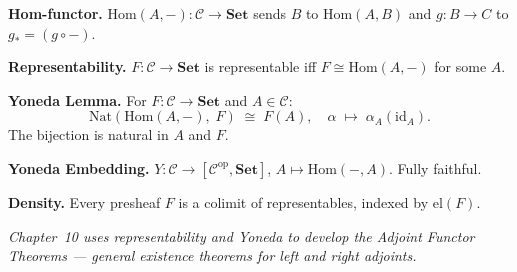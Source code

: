 \begin{formalrestatement}
\textbf{Hom-functor.}\quad
$\mathrm{Hom}(A, -) : \mathcal{C} \to \mathbf{Set}$ sends $B$ to
$\mathrm{Hom}(A, B)$ and $g : B \to C$ to $g_* = (g \circ -)$.

\medskip
\textbf{Representability.}\quad
$F : \mathcal{C} \to \mathbf{Set}$ is representable iff
$F \cong \mathrm{Hom}(A, -)$ for some $A$.

\medskip
\textbf{Yoneda Lemma.}\quad
For $F : \mathcal{C} \to \mathbf{Set}$ and $A \in \mathcal{C}$:
\begin{equation*}
  \mathrm{Nat}(\mathrm{Hom}(A, -),\; F) \;\cong\; F(A),
  \quad \alpha \;\mapsto\; \alpha_A(\mathrm{id}_A).
\end{equation*}
The bijection is natural in $A$ and $F$.

\medskip
\textbf{Yoneda Embedding.}\quad
$\mathit{Y} : \mathcal{C} \to [\mathcal{C}^{\mathrm{op}}, \mathbf{Set}]$,
$A \mapsto \mathrm{Hom}(-, A)$. Fully faithful.

\medskip
\textbf{Density.}\quad
Every presheaf $F$ is a colimit of representables, indexed by
$\mathrm{el}(F)$.

\medskip
\noindent\textit{Chapter~10 uses representability and Yoneda to develop
the Adjoint Functor Theorems --- general existence theorems for left and
right adjoints.}
\end{formalrestatement}
